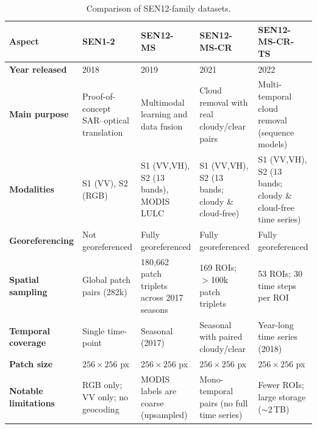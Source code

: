 \begin{table}[!h]
    \centering
    \caption{Comparison of SEN12-family datasets.}
    \label{tab:sen12_datasets}
    \setlength{\tabcolsep}{4pt} %
    \renewcommand{\arraystretch}{1.15} %
    \begin{adjustbox}{max width=\textwidth, keepaspectratio=false}
    \begin{tabular}{P{2.6cm} P{3.4cm} P{3.4cm} P{3.6cm} P{3.6cm}}
        \toprule
        \textbf{Aspect} &
        \textbf{SEN1-2}~\cite{sen12_2018} &
        \textbf{SEN12-MS}~\cite{sen12ms_2019} &
        \textbf{SEN12-MS-CR}~\cite{sen12ms-cr_2021} &
        \textbf{SEN12-MS-CR-TS}~\cite{sen12ms-cr-ts_2022} \\
        \midrule
        \textbf{Year released} &
        2018 & 2019 & 2021 & 2022 \\
        \addlinespace[6pt]
        \textbf{Main purpose} &
        Proof-of-concept SAR–optical translation &
        Multimodal learning and data fusion &
        Cloud removal with real cloudy/clear pairs &
        Multi-temporal cloud removal (sequence models) \\
        \addlinespace[6pt]
        \textbf{Modalities} &
        S1 (VV), S2 (RGB) &
        S1 (VV,VH), S2 (13 bands), MODIS LULC &
        S1 (VV,VH), S2 (13 bands; cloudy \& cloud-free) &
        S1 (VV,VH), S2 (13 bands; cloudy \& cloud-free time series) \\
        \addlinespace[6pt]
        \textbf{Georeferencing} &
        Not georeferenced &
        Fully georeferenced &
        Fully georeferenced &
        Fully georeferenced \\
        \addlinespace[6pt]
        \textbf{Spatial sampling} &
        Global patch pairs (282k) &
        180,662 patch triplets across 2017 seasons &
        169 ROIs; $>$100k patch triplets &
        53 ROIs; 30 time steps per ROI \\
        \addlinespace[6pt]
        \textbf{Temporal coverage} &
        Single time-point &
        Seasonal (2017) &
        Seasonal with paired cloudy/clear &
        Year-long time series (2018) \\
        \addlinespace[6pt]
        \textbf{Patch size} &
        $256\times256$ px &
        $256\times256$ px &
        $256\times256$ px &
        $256\times256$ px \\
        \addlinespace[6pt]
        \textbf{Notable limitations} &
        RGB only; VV only; no geocoding &
        MODIS labels are coarse (upsampled) &
        Mono-temporal pairs (no full time series) &
        Fewer ROIs; large storage ($\sim$2\,TB) \\
        \bottomrule
    \end{tabular}
    \end{adjustbox}
\end{table}

